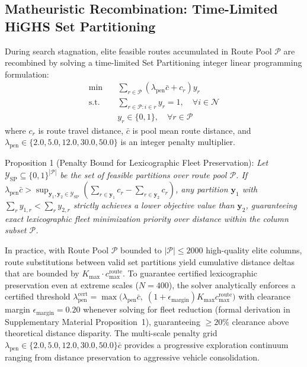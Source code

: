 \documentclass{ieeeaccess}
\begin{document}
\subsection{Matheuristic Recombination: Time-Limited HiGHS Set Partitioning}
\label{sec:set_partitioning}

During search stagnation, elite feasible routes accumulated in Route Pool $\mathcal{P}$ are recombined by solving a time-limited Set Partitioning integer linear programming formulation:
\begin{align}
  \min \quad &\sum_{r \in \mathcal{P}} \left( \lambda_{\text{pen}} \bar{c} + c_r \right) y_r \label{eq:sp_obj} \\
  \text{s.t.} \quad &\sum_{r \in \mathcal{P} : i \in r} y_r = 1, \quad \forall i \in \mathcal{N} \label{eq:sp_cover} \\
  &y_r \in \{0, 1\}, \quad \forall r \in \mathcal{P} \label{eq:sp_binary}
\end{align}
where $c_r$ is route travel distance, $\bar{c}$ is pool mean route distance, and $\lambda_{\text{pen}} \in \{2.0, 5.0, 12.0, 30.0, 50.0\}$ is an integer penalty multiplier. 

\vspace{1mm}
\noindent Proposition 1 (Penalty Bound for Lexicographic Fleet Preservation): \textit{Let $\mathcal{Y}_{\text{SP}} \subseteq \{0, 1\}^{|\mathcal{P}|}$ be the set of feasible partitions over route pool $\mathcal{P}$. If $\lambda_{\text{pen}} \bar{c} > \sup_{\mathbf{y}_1, \mathbf{y}_2 \in \mathcal{Y}_{\text{SP}}} \left( \sum_{r \in \mathbf{y}_1} c_r - \sum_{r \in \mathbf{y}_2} c_r \right)$, any partition $\mathbf{y}_1$ with $\sum_{r} y_{1, r} < \sum_{r} y_{2, r}$ strictly achieves a lower objective value than $\mathbf{y}_2$, guaranteeing exact lexicographic fleet minimization priority over distance within the column subset $\mathcal{P}$.}
\vspace{1mm}

In practice, with Route Pool $\mathcal{P}$ bounded to $|\mathcal{P}| \le 2000$ high-quality elite columns, route substitutions between valid set partitions yield cumulative distance deltas that are bounded by $K_{\max} \cdot c_{\max}^{\text{route}}$. To guarantee certified lexicographic preservation even at extreme scales ($N=400$), the solver analytically enforces a certified threshold $\lambda_{\text{pen}}^{\text{cert}} = \max\bigl(\lambda_{\text{pen}}\bar{c}, \; (1 + \epsilon_{\text{margin}}) K_{\max} c_{\max}^{\text{route}}\bigr)$ with clearance margin $\epsilon_{\text{margin}} = 0.20$ whenever solving for fleet reduction (formal derivation in Supplementary Material Proposition~1), guaranteeing $\ge 20\%$ clearance above theoretical distance disparity. The multi-scale penalty grid $\lambda_{\text{pen}} \in \{2.0, 5.0, 12.0, 30.0, 50.0\}\bar{c}$ provides a progressive exploration continuum ranging from distance preservation to aggressive vehicle consolidation.
\end{document}
